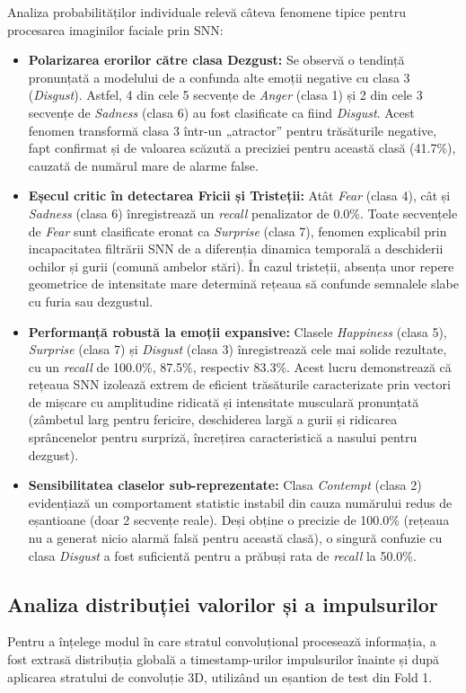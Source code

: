 Analiza probabilităților individuale relevă câteva fenomene tipice pentru procesarea imaginilor faciale prin SNN:
\begin{itemize}
	\item \textbf{Polarizarea erorilor către clasa Dezgust:} Se observă o tendință pronunțată a modelului de a confunda alte emoții negative cu clasa 3 (\textit{Disgust}). Astfel, 4 din cele 5 secvențe de \textit{Anger} (clasa 1) și 2 din cele 3 secvențe de \textit{Sadness} (clasa 6) au fost clasificate ca fiind \textit{Disgust}. Acest fenomen transformă clasa 3 într-un „atractor” pentru trăsăturile negative, fapt confirmat și de valoarea scăzută a preciziei pentru această clasă (41.7\%), cauzată de numărul mare de alarme false.
	\item \textbf{Eșecul critic în detectarea Fricii și Tristeții:} Atât \textit{Fear} (clasa 4), cât și \textit{Sadness} (clasa 6) înregistrează un \textit{recall} penalizator de 0.0\%. Toate secvențele de \textit{Fear} sunt clasificate eronat ca \textit{Surprise} (clasa 7), fenomen explicabil prin incapacitatea filtrării SNN de a diferenția dinamica temporală a deschiderii ochilor și gurii (comună ambelor stări). În cazul tristeții, absența unor repere geometrice de intensitate mare determină rețeaua să confunde semnalele slabe cu furia sau dezgustul.
	\item \textbf{Performanță robustă la emoții expansive:} Clasele \textit{Happiness} (clasa 5), \textit{Surprise} (clasa 7) și \textit{Disgust} (clasa 3) înregistrează cele mai solide rezultate, cu un \textit{recall} de 100.0\%, 87.5\%, respectiv 83.3\%. Acest lucru demonstrează că rețeaua SNN izolează extrem de eficient trăsăturile caracterizate prin vectori de mișcare cu amplitudine ridicată și intensitate musculară pronunțată (zâmbetul larg pentru fericire, deschiderea largă a gurii și ridicarea sprâncenelor pentru surpriză, încrețirea caracteristică a nasului pentru dezgust).
	\item \textbf{Sensibilitatea claselor sub-reprezentate:} Clasa \textit{Contempt} (clasa 2) evidențiază un comportament statistic instabil din cauza numărului redus de eșantioane (doar 2 secvențe reale). Deși obține o precizie de 100.0\% (rețeaua nu a generat nicio alarmă falsă pentru această clasă), o singură confuzie cu clasa \textit{Disgust} a fost suficientă pentru a prăbuși rata de \textit{recall} la 50.0\%.
\end{itemize}

\subsection*{Analiza distribuției valorilor și a impulsurilor}
Pentru a înțelege modul în care stratul convoluțional procesează informația, a fost extrasă distribuția globală a timestamp-urilor impulsurilor înainte și după aplicarea stratului de convoluție 3D, utilizând un eșantion de test din Fold 1.

